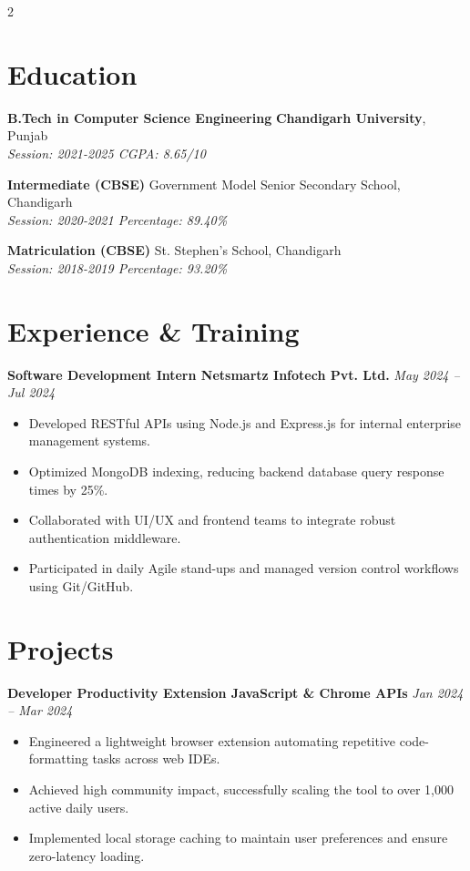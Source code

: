 \documentclass[10pt,a4paper]{article}
\begin{document}
\begin{paracol}{2}
\section*{Education}
\textbf{B.Tech in Computer Science Engineering} \textbar{} \textbf{Chandigarh University}, Punjab \\
\textit{Session: 2021-2025 \textbar{} CGPA: 8.65/10}

\vspace{5pt}
\textbf{Intermediate (CBSE)} \textbar{} Government Model Senior Secondary School, Chandigarh \\
\textit{Session: 2020-2021 \textbar{} Percentage: 89.40\%}

\vspace{5pt}
\textbf{Matriculation (CBSE)} \textbar{} St. Stephen's School, Chandigarh \\
\textit{Session: 2018-2019 \textbar{} Percentage: 93.20\%}

\section*{Experience \& Training}
\textbf{Software Development Intern \textbar{} Netsmartz Infotech Pvt. Ltd.} \hfill \textit{May 2024 -- Jul 2024}
\begin{itemize}
\item Developed RESTful APIs using Node.js and Express.js for internal enterprise management systems.
\item Optimized MongoDB indexing, reducing backend database query response times by 25\%.
\item Collaborated with UI/UX and frontend teams to integrate robust authentication middleware.
\item Participated in daily Agile stand-ups and managed version control workflows using Git/GitHub.
\end{itemize}

\section*{Projects}

\textbf{Developer Productivity Extension \textbar{} JavaScript \& Chrome APIs} \hfill \textit{Jan 2024 -- Mar 2024}
\begin{itemize}
\item Engineered a lightweight browser extension automating repetitive code-formatting tasks across web IDEs.
\item Achieved high community impact, successfully scaling the tool to over 1,000 active daily users.
\item Implemented local storage caching to maintain user preferences and ensure zero-latency loading.
\end{itemize}


\end{paracol}
\end{document}
